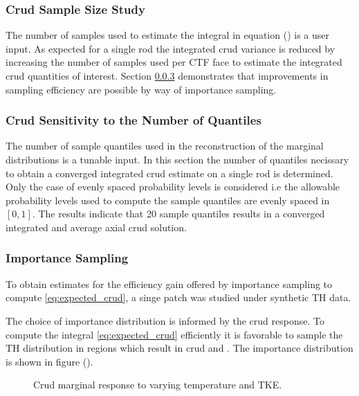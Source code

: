 \subsubsection{Crud Sample Size Study}

The number of samples used to estimate the integral in equation () is a user input.
As expected for a single rod the integrated crud variance is reduced by increasing the number of samples used per CTF face to estimate the integrated crud quantities of interest.   Section \ref{sec:Importance Sampling} demonstrates that improvements in sampling efficiency are possible by way of importance sampling.

\subsubsection{Crud Sensitivity to the Number of Quantiles}

The number of sample quantiles used in the reconstruction of the marginal distributions is a tunable input.  In this section the number of quantiles necissary to obtain a converged integrated crud estimate on a single rod is determined.  Only the case of evenly spaced probability levels is considered i.e the allowable probability levels used to compute the sample quantiles are evenly spaced in $[0, 1]$.   The results indicate that 20 sample quantiles results in a converged integrated and average axial crud solution.  


\subsubsection{Importance Sampling}
\label{sec:Importance Sampling}

To obtain estimates for the efficiency gain offered by importance sampling to compute \ref{eq:expected_crud}, a singe patch was studied under synthetic TH data.

The choice of importance distribution is informed by the crud response.  To compute the integral \ref{eq:expected_crud} efficiently it is favorable to sample the TH distribution in regions which result in crud and .  The importance distribution is shown in figure ().  

\begin{figure}[H]%
    \centering
    \qquad
    \caption[]{Crud marginal response to varying temperature and TKE.}%
    \label{fig:crud_sensi1}%
\end{figure}


